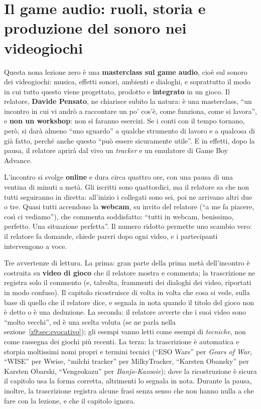 \chapter[Il game audio]{Il game audio: ruoli, storia e produzione del
sonoro nei videogiochi}
\label{z9:cap:audio}

Questa nona lezione zero è una \textbf{masterclass sul game audio}, cioè sul
sonoro dei videogiochi: musica, effetti sonori, ambienti e dialoghi, e soprattutto
il modo in cui tutto questo viene progettato, prodotto e \textbf{integrato} in un
gioco. Il relatore, \textbf{Davide Pensato}, ne chiarisce subito la natura: è una
masterclass, ``un incontro in cui vi andrò a raccontare un po' cos'è, come
funziona, come si lavora'', e \textbf{non un workshop}: non si faranno esercizi.
Se i conti con il tempo tornano, però, si darà almeno ``uno sguardo'' a qualche
strumento di lavoro e a qualcosa di già fatto, perché anche questo ``può essere
sicuramente utile''. E in effetti, dopo la pausa, il relatore aprirà dal vivo un
\emph{tracker} e un emulatore di Game Boy Advance.

L'incontro si svolge \textbf{online} e dura circa quattro ore, con una pausa di
una ventina di minuti a metà. Gli iscritti sono quattordici, ma il relatore sa
che non tutti seguiranno in diretta: all'inizio i collegati sono sei, poi ne
arrivano altri due o tre. Quasi tutti accendono la \textbf{webcam}, su invito del
relatore (``a me fa piacere, così ci vediamo''), che commenta soddisfatto:
``tutti in webcam, benissimo, perfetto. Una situazione perfetta''. Il numero
ridotto permette uno scambio vero: il relatore fa domande, chiede pareri dopo
ogni video, e i partecipanti intervengono a voce.

Tre avvertenze di lettura. La prima: gran parte della prima metà dell'incontro è
costruita su \textbf{video di gioco} che il relatore mostra e commenta; la
trascrizione ne registra solo il commento (e, talvolta, frammenti dei dialoghi
dei video, riportati in modo confuso). Il capitolo ricostruisce di volta in volta
che cosa si vede, sulla base di quello che il relatore dice, e segnala in nota
quando il titolo del gioco non è detto o è una deduzione. La seconda: il
relatore avverte che i suoi video sono ``molto vecchi'', ed è una scelta voluta
(se ne parla nella sezione~\ref{z9:sec:evocativo}); gli esempi vanno letti come
esempi di \emph{tecniche}, non come rassegna dei giochi più recenti. La terza: la
trascrizione è automatica e storpia moltissimi nomi propri e termini tecnici
(``ESO Wars'' per \emph{Gears of War}, ``WISE'' per Wwise, ``milchi tracker''
per MilkyTracker, ``Karsten Obansky'' per Karsten Obarski, ``Vengeokazu'' per
\emph{Banjo-Kazooie}); dove la ricostruzione è sicura il capitolo usa la forma
corretta, altrimenti lo segnala in nota. Durante la pausa, inoltre, la
trascrizione registra alcune frasi senza senso che non hanno nulla a che fare con
la lezione, e che il capitolo ignora.

